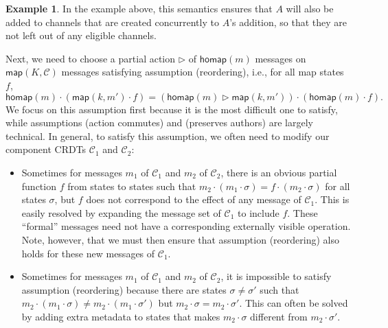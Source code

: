 \documentclass[acmsmall,nonacm,12pt]{acmart}
\newcommand{\mc}[1]{\ensuremath{\mathcal{#1}}}
\newcommand{\msf}[1]{\ensuremath{\mathsf{#1}}}
\newcommand{\act}{\triangleright}
\theoremstyle{plain}
\theoremstyle{definition}
\newtheorem{myex}[mythm]{Example}
\begin{document}
\begin{myex}
In the example above, this semantics ensures that $A$ will also be added to channels that are created concurrently to $A$'s addition, so that they are not left out of any eligible channels.
\end{myex}

Next, we need to choose a partial action $\act$ of $\msf{homap}(m)$ messages on $\msf{map}(K, \mc{C})$ messages satisfying assumption (reordering), i.e., for all map states $f$,
\begin{equation}
\label{reordering_ex}
\msf{homap}(m) \cdot (\msf{map}(k, m') \cdot f) = (\msf{homap}(m) \act \msf{map}(k, m')) \cdot (\msf{homap}(m) \cdot f).
\end{equation}
We focus on this assumption first because it is the most difficult one to satisfy, while assumptions (action commutes) and (preserves authors) are largely technical.  In general, to satisfy this assumption, we often need to modify our component CRDTs $\mc{C}_1$ and $\mc{C}_2$:
\begin{itemize}
    \item Sometimes for messages $m_1$ of $\mc{C}_1$ and $m_2$ of $\mc{C}_2$, there is an obvious partial function $f$ from states to states such that $m_2 \cdot (m_1 \cdot \sigma) = f \cdot (m_2 \cdot \sigma)$ for all states $\sigma$, but $f$ does not correspond to the effect of any message of $\mc{C}_1$.  This is easily resolved by expanding the message set of $\mc{C}_1$ to include $f$.  These ``formal'' messages need not have a corresponding externally visible operation.  Note, however, that we must then ensure that assumption (reordering) also holds for these new messages of $\mc{C}_1$.
    \item Sometimes for messages $m_1$ of $\mc{C}_1$ and $m_2$ of $\mc{C}_2$, it is impossible to satisfy assumption (reordering) because there are states $\sigma \neq \sigma'$ such that $m_2 \cdot (m_1 \cdot \sigma) \neq m_2 \cdot (m_1 \cdot \sigma')$ but $m_2 \cdot \sigma = m_2 \cdot \sigma'$.  This can often be solved by adding extra metadata to states that makes $m_2 \cdot \sigma$ different from $m_2 \cdot \sigma'$.
\end{itemize}
\end{document}
